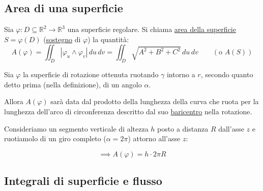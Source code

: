 \subsection{Area di una superficie}

\begin{definition}
Sia $\varphi : D \subseteq \mathbb{R}^2 \to \mathbb{R}^3$ una superficie regolare. Si chiama \underline{area della superficie} $S = \varphi(D)$ (\underline{sostegno} di $\varphi$) la quantità:
\[
A(\varphi) = \iint_D |\varphi_u \wedge \varphi_v|\, du\, dv = \iint_D \sqrt{A^2 + B^2 + C^2}\, du\, dv \qquad (\text{o } A(S))
\]
\end{definition}

\begin{theorem}
Sia $\varphi$ la superficie di rotazione ottenuta ruotando $\gamma$ intorno a $r$, secondo quanto detto prima (nella definizione), di un angolo $\alpha$.

Allora $A(\varphi)$ sarà data dal prodotto della lunghezza della curva che ruota per la lunghezza dell'arco di circonferenza descritto dal suo \underline{baricentro} nella rotazione.
\end{theorem}

\begin{esercizio}[EXE]
Consideriamo un segmento verticale di altezza $h$ posto a distanza $R$ dall'asse $z$ e ruotiamolo di un giro completo ($\alpha = 2\pi$) attorno all'asse $z$:

\begin{center}
\end{center}
\[
\implies A(\varphi) = h \cdot 2\pi R
\]
\end{esercizio}

\subsection{Integrali di superficie e flusso}

